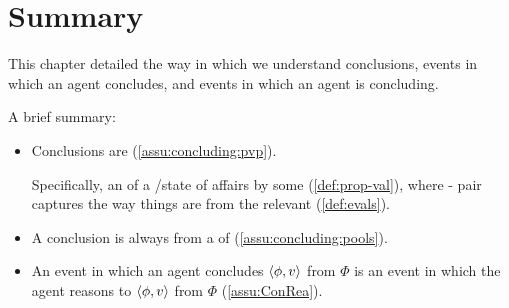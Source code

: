 


\section*{Summary}

\begin{note}
  This chapter detailed the way in which we understand conclusions, events in which an agent concludes, and events in which an agent is concluding.
\end{note}


\begin{note}
  A brief summary:
  \begin{itemize}
  \item
    Conclusions are  (\autoref{assu:concluding:pvp}).

    Specifically, an \eval{} of a /state of affairs by some  (\autoref{def:prop-val}), where - pair captures the way things are from the relevant \agpe{} (\autoref{def:evals}).
  \item
    A conclusion is always from a  of  (\autoref{assu:concluding:pools}).
  \item
    An event in which an agent concludes \(\langle \phi, v \rangle\) from \(\Phi\) is an event in which the agent reasons to \(\langle \phi, v \rangle\) from \(\Phi\) (\autoref{assu:ConRea}).
  \end{itemize}
\end{note}

